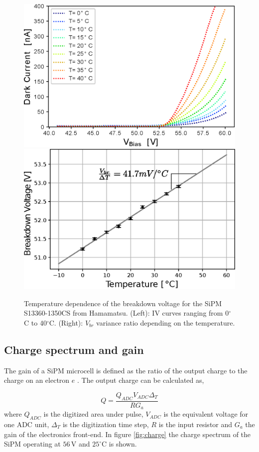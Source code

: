 \documentclass[a4paper,11pt]{article}
\begin{document}
\begin{figure}[htbp]
\centering %
\includegraphics[width=.47\textwidth]{Figures/dc_13360.eps}
\qquad
\includegraphics[width=.47\textwidth]{Figures/Vbd_vs_T_S13360.eps}
\caption{\label{fig:IVcurve} Temperature dependence of the breakdown voltage for the SiPM S13360-1350CS from Hamamatsu. (Left): IV curves ranging from 0$^{\circ}$C to 40$^{\circ}$C. (Right): $V_{br}$ variance ratio depending on the temperature.}
\end{figure}

\subsection{Charge spectrum and gain}

The gain of a SiPM microcell is defined as the ratio of the output charge to the charge on an electron $e$ \cite{Acerbi2019}. The output charge can be calculated as,

\begin{equation}
\label{eq:charge}
Q = \frac{Q_{ADC}V_{ADC}\Delta_T}{RG_a}
\end{equation}
where $Q_{ADC}$ is the digitized area under pulse, $V_{ADC}$ is the equivalent voltage for one ADC unit, $\Delta_T$ is the digitization time step, $R$ is the input resistor and $G_a$ the gain of the electronics front-end. In figure \ref{fig:charge} the charge spectrum of the SiPM operating at $56$\,V and $25^{\circ}$C is shown.
\end{document}

